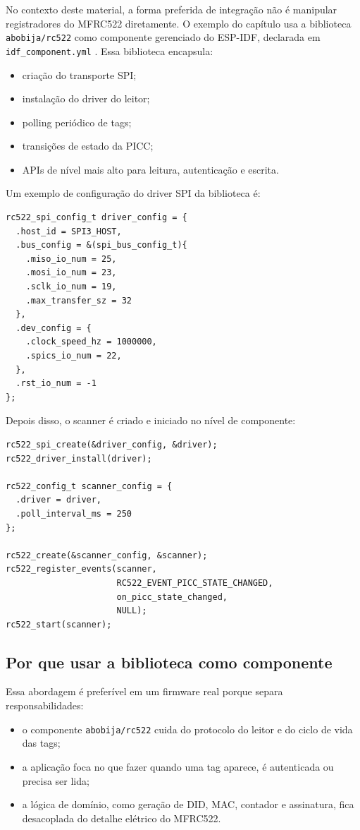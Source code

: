 No contexto deste material, a forma preferida de integração não é manipular registradores do MFRC522 diretamente. O exemplo do capítulo usa a biblioteca \texttt{abobija/rc522} como componente gerenciado do ESP-IDF, declarada em \texttt{idf\_component.yml} \citep{abobija_rc522}. Essa biblioteca encapsula:
\begin{itemize}[leftmargin=*]
  \item criação do transporte SPI;
  \item instalação do driver do leitor;
  \item polling periódico de tags;
  \item transições de estado da PICC;
  \item APIs de nível mais alto para leitura, autenticação e escrita.
\end{itemize}

Um exemplo de configuração do driver SPI da biblioteca é:
\begin{verbatim}
rc522_spi_config_t driver_config = {
  .host_id = SPI3_HOST,
  .bus_config = &(spi_bus_config_t){
    .miso_io_num = 25,
    .mosi_io_num = 23,
    .sclk_io_num = 19,
    .max_transfer_sz = 32
  },
  .dev_config = {
    .clock_speed_hz = 1000000,
    .spics_io_num = 22,
  },
  .rst_io_num = -1
};
\end{verbatim}

Depois disso, o scanner é criado e iniciado no nível de componente:
\begin{verbatim}
rc522_spi_create(&driver_config, &driver);
rc522_driver_install(driver);

rc522_config_t scanner_config = {
  .driver = driver,
  .poll_interval_ms = 250
};

rc522_create(&scanner_config, &scanner);
rc522_register_events(scanner,
                      RC522_EVENT_PICC_STATE_CHANGED,
                      on_picc_state_changed,
                      NULL);
rc522_start(scanner);
\end{verbatim}

\subsection{Por que usar a biblioteca como componente}
Essa abordagem é preferível em um firmware real porque separa responsabilidades:
\begin{itemize}[leftmargin=*]
  \item o componente \texttt{abobija/rc522} cuida do protocolo do leitor e do ciclo de vida das tags;
  \item a aplicação foca no que fazer quando uma tag aparece, é autenticada ou precisa ser lida;
  \item a lógica de domínio, como geração de DID, MAC, contador e assinatura, fica desacoplada do detalhe elétrico do MFRC522.
\end{itemize}

